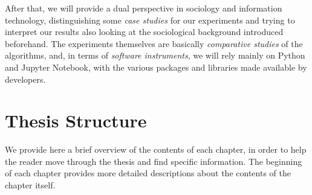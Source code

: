 After that, we will provide a dual perspective in sociology and information technology, distinguishing some \textit{case studies} for our experiments and trying to interpret our results also looking at the sociological background introduced beforehand.
The experiments themselves are basically \textit{comparative studies} of the algorithms, and, in terms of \textit{software instruments}, we will rely mainly on Python and Jupyter Notebook, with the various packages and libraries made available by developers.


\section{Thesis Structure}
We provide here a brief overview of the contents of each chapter, in order to help the reader move through the thesis and find specific information. The beginning of each chapter provides more detailed descriptions about the contents of the chapter itself.

